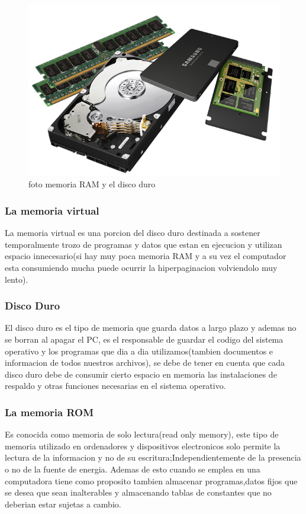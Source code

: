 \documentclass{article}
\begin{document}
            \begin{figure}[h]
            \includegraphics[width=6 cm]{imagenes/ram+hdd+ssd.png}
            \centering
            \caption{foto memoria RAM y el disco duro}
            \label{fig:ram+hdd+ssd}
            \end{figure}
            
        \subsubsection{La memoria virtual}
        La memoria virtual es una porcion del disco duro destinada a sostener temporalmente trozo de programas y datos que estan en ejecucion y utilizan espacio innecesario(si hay muy poca memoria RAM y a su vez el computador esta consumiendo mucha puede ocurrir la hiperpaginacion volviendolo muy lento).

        \subsubsection{Disco Duro}
        El disco duro es el tipo de memoria que guarda datos a largo plazo y ademas no se borran al apagar el PC\cite{digitaltrends}, es el responsable de guardar el codigo del sistema operativo y los programas que dia a dia utilizamos(tambien documentos e informacion de todos nuestros archivos),
        se debe de tener en cuenta  que cada disco duro debe de consumir cierto espacio en memoria las instalaciones de respaldo y otras funciones necesarias en el sistema operativo.
        
        \subsubsection{La memoria ROM}
        Es conocida como memoria de solo lectura(read only memory), este tipo de memoria utilizado en ordenadores y dispositivos electronicos solo permite la lectura de la informacion y no de su escritura;Independientemente  de la presencia o no de la fuente de energia. Ademas de esto  cuando se emplea en una computadora tiene como proposito tambien almacenar programas,datos fijos que se desea que sean inalterables y  almacenando tablas de constantes que no deberian estar sujetas a cambio.\cite{aca}
    
\end{document}
